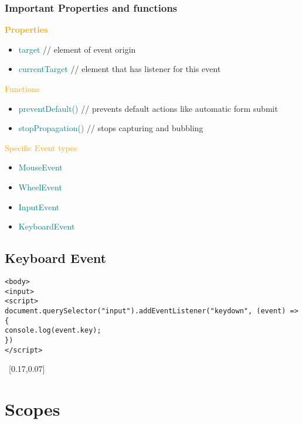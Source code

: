 \documentclass[main.tex,fontsize=6pt,paper=a4,paper=landscape,DIV=calc,]{scrartcl}
\begin{document}
\begin{multicols*}{4}
\subsubsection{Important Properties and functions}  
\textcolor{orange}{\textbf{Properties}}
\begin{itemize}
  \item \textcolor{teal}{target} // element of event origin 
  \item \textcolor{teal}{currentTarget} // element that has listener for this event
\end{itemize}
\textcolor{orange}{Functions}
\begin{itemize}
  \item \textcolor{teal}{preventDefault()} // prevents default actions like automatic form submit
  \item \textcolor{teal}{stopPropagation()} // stops capturing and bubbling
\end{itemize}
\textcolor{orange}{Specific Event types}
\begin{itemize}
  \item \textcolor{teal}{MouseEvent}
  \item \textcolor{teal}{WheelEvent}
  \item \textcolor{teal}{InputEvent}
  \item \textcolor{teal}{KeyboardEvent}
\end{itemize}

\subsection{Keyboard Event}  
\begin{lstlisting}
<body>
<input>
<script>
document.querySelector("input").addEventListener("keydown", (event) => {
console.log(event.key);
})
</script>
\end{lstlisting}
\, \newline
{}[0.17,0.07]

\section{Scopes}


\end{multicols*}
\end{document}
